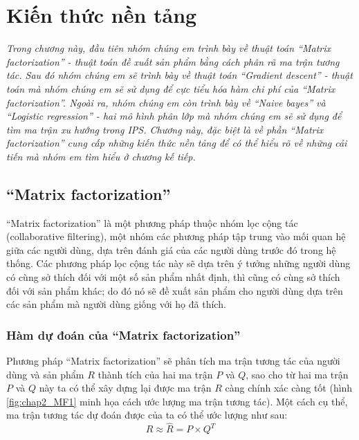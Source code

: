 \chapter{Kiến thức nền tảng}
\label{Chapter2}

\noindent \textit{Trong chương này, đầu tiên nhóm chúng em trình bày về thuật toán ``Matrix factorization'' - thuật toán đề xuất sản phẩm bằng cách phân rã ma trận tương tác. Sau đó nhóm chúng em sẽ trình bày về thuật toán ``Gradient descent'' - thuật toán mà nhóm chúng em sẽ sử dụng để cực tiểu hóa hàm chi phí của  ``Matrix factorization''. Ngoài ra, nhóm chúng em còn trình bày về ``Naive bayes'' và ``Logistic regression'' - hai mô hình phân lớp mà nhóm chúng em sẽ sử dụng để tìm ma trận xu hướng trong IPS. Chương này, đặc biệt là về phần ``Matrix factorization'' cung cấp những kiến thức nền tảng để có thể hiểu rõ về những cải tiến mà nhóm em tìm hiểu ở chương kế tiếp.}

\section{``Matrix factorization''}
``Matrix factorization'' là một phương pháp thuộc nhóm lọc cộng tác (collaborative filtering), một nhóm các phương pháp tập trung vào mối quan hệ giữa các người dùng, dựa trên đánh giá của các người dùng trước đó trong hệ thống. Các phương pháp lọc cộng tác này sẽ dựa trên ý tưởng những người dùng có cùng sở thích đối với một số sản phẩm nhất định, thì cũng có cùng sở thích đối với sản phẩm khác; do đó nó sẽ đề xuất sản phẩm cho người dùng dựa trên các sản phẩm mà người dùng giống với họ đã thích.

\subsection{Hàm dự đoán của ``Matrix factorization''}
Phương pháp ``Matrix factorization'' sẽ phân tích ma trận tương tác của người dùng và sản phẩm $R$ thành tích của hai ma trận $P$ và $Q$, sao cho từ hai ma trận $P$ và $Q$ này ta có thể xây dựng lại được ma trận $R$ càng chính xác càng tốt (hình \ref{fig:chap2_MF1} minh họa cách ước lượng ma trận tương tác). Một cách cụ thể, ma trận tương tác dự đoán được của ta có thể ước lượng như sau:
\begin{equation}
\label{eq:2.1_MF}
    R \approx \hat{R} = P \times Q^T
\end{equation}

